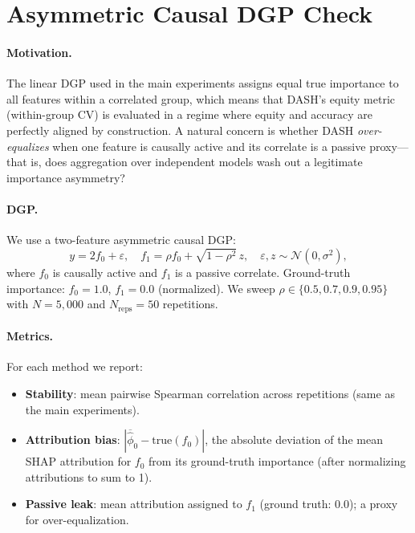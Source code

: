\documentclass[11pt]{article}
\newcommand{\dash}{\textsc{DASH}}
\begin{document}
\section{Asymmetric Causal DGP Check}
\label{app:asymmetric}

\paragraph{Motivation.}
The linear DGP used in the main experiments assigns equal true importance
to all features within a correlated group, which means that \dash{}'s
equity metric (within-group CV) is evaluated in a regime where equity
and accuracy are perfectly aligned by construction.
A natural concern is whether \dash{} \emph{over-equalizes} when one
feature is causally active and its correlate is a passive proxy---that
is, does aggregation over independent models wash out a legitimate
importance asymmetry?

\paragraph{DGP.}
We use a two-feature asymmetric causal DGP:
\[
  y = 2 f_0 + \varepsilon, \quad
  f_1 = \rho f_0 + \sqrt{1 - \rho^2}\, z, \quad
  \varepsilon, z \sim \mathcal{N}(0, \sigma^2),
\]
where $f_0$ is causally active and $f_1$ is a passive correlate.
Ground-truth importance: $f_0 = 1.0$, $f_1 = 0.0$ (normalized).
We sweep $\rho \in \{0.5, 0.7, 0.9, 0.95\}$ with $N = 5{,}000$ and
$N_{\text{reps}} = 50$ repetitions.

\paragraph{Metrics.}
For each method we report:
\begin{itemize}
  \item \textbf{Stability}: mean pairwise Spearman correlation across
    repetitions (same as the main experiments).
  \item \textbf{Attribution bias}: $|\overline{\hat{\phi}}_0 - \text{true}(f_0)|$,
    the absolute deviation of the mean SHAP attribution for $f_0$ from its
    ground-truth importance (after normalizing attributions to sum to 1).
  \item \textbf{Passive leak}: mean attribution assigned to $f_1$
    (ground truth: 0.0); a proxy for over-equalization.
\end{itemize}
\end{document}
